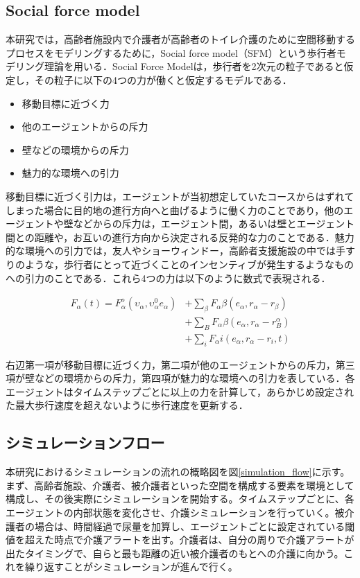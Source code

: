\subsection{Social force model}

本研究では，高齢者施設内で介護者が高齢者のトイレ介護のために空間移動するプロセスをモデリングするために，Social force model（SFM）\cite{SFM}という歩行者モデリング理論を用いる．Social Force Modelは，歩行者を2次元の粒子であると仮定し，その粒子に以下の4つの力が働くと仮定するモデルである．

\begin{itemize}
 \item 移動目標に近づく力
 \item 他のエージェントからの斥力
 \item 壁などの環境からの斥力
 \item 魅力的な環境への引力
\end{itemize}

移動目標に近づく引力は，エージェントが当初想定していたコースからはずれてしまった場合に目的地の進行方向へと曲げるように働く力のことであり，他のエージェントや壁などからの斥力は，エージェント間，あるいは壁とエージェント間との距離や，お互いの進行方向から決定される反発的な力のことである．魅力的な環境への引力では，友人やショーウィンドー，高齢者支援施設の中では手すりのような，歩行者にとって近づくことのインセンティブが発生するようなものへの引力のことである．これら4つの力は以下のように数式で表現される．

\begin{equation}
\begin{split}
 F_α(t)=F_α^o(υ_α,υ_α^0e_α)&+\sum_{β}F_αβ(e_α,r_α-r_β)\\
 &+\sum_{B}F_αβ(e_α,r_α-r_B^α)\\
 &+\sum_{i}F_αi(e_α,r_α-r_i,t)
\end{split}
\end{equation}

右辺第一項が移動目標に近づく力，第二項が他のエージェントからの斥力，第三項が壁などの環境からの斥力，第四項が魅力的な環境への引力を表している．各エージェントはタイムステップごとに以上の力を計算して，あらかじめ設定された最大歩行速度を超えないように歩行速度を更新する．

\subsection{シミュレーションフロー}

本研究におけるシミュレーションの流れの概略図を図\ref{simulation_flow}に示す。まず、高齢者施設、介護者、被介護者といった空間を構成する要素を環境として構成し、その後実際にシミュレーションを開始する。タイムステップごとに、各エージェントの内部状態を変化させ、介護シミュレーションを行っていく。被介護者の場合は、時間経過で尿量を加算し、エージェントごとに設定されている閾値を超えた時点で介護アラートを出す。介護者は、自分の周りで介護アラートが出たタイミングで、自らと最も距離の近い被介護者のもとへの介護に向かう。これを繰り返すことがシミュレーションが進んで行く。

